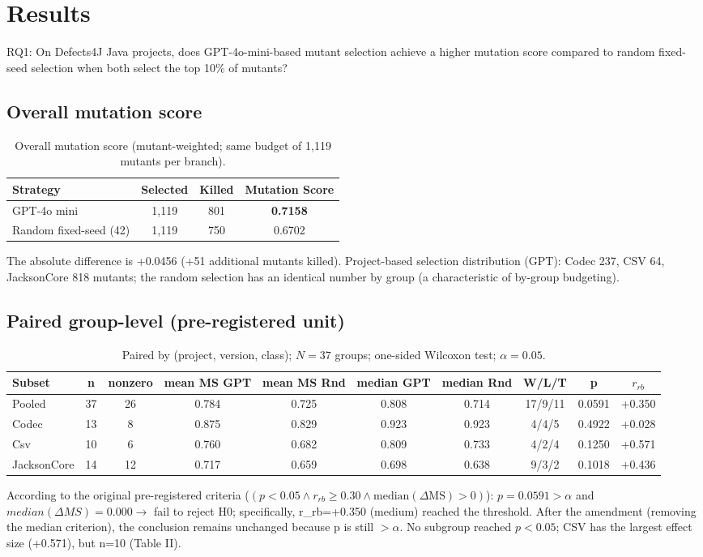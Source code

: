 \section{Results}
RQ1: On Defects4J Java projects, does GPT-4o-mini-based mutant selection achieve a higher mutation score compared to random fixed-seed selection when both select the top 10\% of mutants?
\subsection{Overall mutation score}
\begin{table}[ht]
\centering
\caption{Overall mutation score (mutant-weighted; same budget of 1,119 mutants per branch).}
\label{tab:overall-mutation-score}
\begin{tabular}{lccc}
\hline
\textbf{Strategy} & \textbf{Selected} & \textbf{Killed} & \textbf{Mutation Score} \\
\hline
GPT-4o mini & 1,119 & 801 & \textbf{0.7158} \\
Random fixed-seed (42) & 1,119 & 750 & 0.6702 \\
\hline
\end{tabular}
\end{table}
The absolute difference is +0.0456 (+51 additional mutants killed). Project-based selection distribution (GPT): Codec 237, CSV 64, JacksonCore 818 mutants; the random selection has an identical number by group (a characteristic of by-group budgeting).
\subsection{Paired group-level (pre-registered unit)}
\begin{table}[ht]
\centering
\caption{Paired by (project, version, class); $N = 37$ groups; one-sided Wilcoxon test; $\alpha = 0.05$.}
\label{tab:paired-results}
\begin{tabular}{lccccccccc}
\toprule
\textbf{Subset} &
\textbf{n} &
\textbf{nonzero} &
\textbf{mean MS GPT} &
\textbf{mean MS Rnd} &
\textbf{median GPT} &
\textbf{median Rnd} &
\textbf{W/L/T} &
\textbf{p} &
\textbf{$r_{rb}$} \\
\midrule
Pooled       & 37 & 26 & 0.784 & 0.725 & 0.808 & 0.714 & 17/9/11 & 0.0591 & +0.350 \\
Codec        & 13 &  8 & 0.875 & 0.829 & 0.923 & 0.923 & 4/4/5   & 0.4922 & +0.028 \\
Csv          & 10 &  6 & 0.760 & 0.682 & 0.809 & 0.733 & 4/2/4   & 0.1250 & +0.571 \\
JacksonCore  & 14 & 12 & 0.717 & 0.659 & 0.698 & 0.638 & 9/3/2   & 0.1018 & +0.436 \\
\bottomrule
\end{tabular}
\end{table}
According to the original pre-registered criteria ($(p < 0.05 \land r_{rb} \ge 0.30 \land \text{median}(\Delta\text{MS}) > 0)$): $p=0.0591 > \alpha$ and $median(\Delta MS)=0.000 \rightarrow$ fail to reject H0; specifically, r\_rb=+0.350 (medium) reached the threshold. After the amendment (removing the median criterion), the conclusion remains unchanged because p is still $> \alpha$. No subgroup reached $p<0.05$; CSV has the largest effect size (+0.571), but n=10 (Table II).
